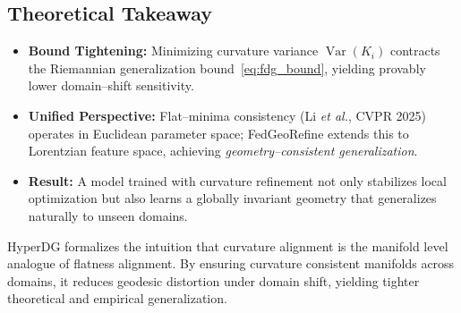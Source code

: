 \documentclass[10pt]{article} %
\begin{document}
\subsection{Theoretical Takeaway}
\begin{itemize}
  \item \textbf{Bound Tightening:}
        Minimizing curvature variance $\operatorname{Var}(K_i)$
        contracts the Riemannian generalization
        bound~\eqref{eq:fdg_bound}, yielding provably lower
        domain--shift sensitivity.
  \item \textbf{Unified Perspective:}
        Flat--minima consistency (Li \emph{et al.}, CVPR 2025)
        operates in Euclidean parameter space;
        FedGeoRefine extends this to Lorentzian feature space,
        achieving \emph{geometry--consistent generalization}.
  \item \textbf{Result:}
        A model trained with curvature refinement not only stabilizes
        local optimization but also learns a globally invariant geometry
        that generalizes naturally to unseen domains.
\end{itemize}

HyperDG formalizes the intuition that curvature alignment is the
manifold level analogue of flatness alignment.  By ensuring
curvature consistent manifolds across domains, it reduces geodesic
distortion under domain shift, yielding tighter theoretical and
empirical generalization.
\end{document}
